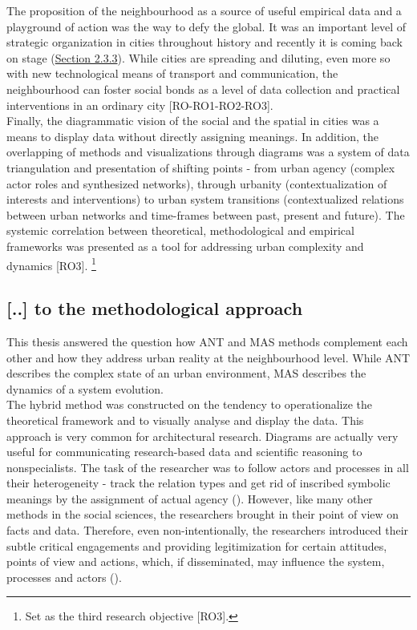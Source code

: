 \documentclass[11pt]{report}
\begin{document}
{{{The proposition of the neighbourhood as a source of  useful empirical data and a playground of action was the way to defy the global. It was an important level of strategic organization in cities throughout history and recently it is coming back on stage (\href{Section 2.3.3}{Section 2.3.3}).
While cities are spreading and diluting, even more so with new technological means of transport and communication, the neighbourhood can foster social bonds as a level of data collection and practical interventions in an ordinary city [RO-RO1-RO2-RO3].
\\

Finally, the diagrammatic vision of the social and the spatial  in cities was a means to display data without directly assigning meanings.
In addition, the overlapping of methods and visualizations through diagrams was a system of data triangulation and presentation of shifting points - from urban agency (complex actor roles and synthesized networks), through urbanity (contextualization of interests and interventions) to urban system transitions (contextualized relations between urban networks and time-frames between past, present and future). The systemic correlation between theoretical, methodological and empirical frameworks was presented as a tool for addressing urban complexity and dynamics [RO3].
\footnote{Set as the third research objective [RO3].}

\subsection{[..] to the methodological approach}

This thesis answered the question how ANT and MAS methods complement each other and how they address urban reality at the neighbourhood level.
While ANT describes the complex state of an urban environment, MAS describes the dynamics of a system evolution.
\\

The hybrid method was constructed on the tendency to operationalize the theoretical framework and to visually analyse and display the data.
This approach is very common for architectural research.
Diagrams are actually very useful for communicating research-based data and scientific reasoning to nonspecialists.
The task of the researcher was to follow actors and processes in all their heterogeneity - track the relation types and get rid of inscribed symbolic meanings by the assignment of actual agency (\href{Nimmo}{\citealt{nimmo_actor-network_2011}}).
However, like many other methods in the social sciences, the researchers brought in their point of view on facts and data. Therefore, even non-intentionally, the researchers introduced their subtle critical engagements and providing legitimization for certain attitudes, points of view and actions, which, if disseminated, may influence the system, processes and actors (\href{Baiocchi}{\citealt{baiocchi_actor-network_2013}}).
\\

}}}
\end{document}
